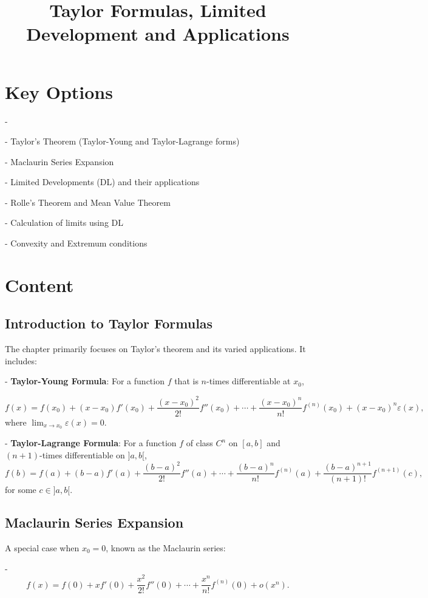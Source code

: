 \documentclass{article}
\title{Taylor Formulas, Limited Development and Applications}
\author{}
\date{}
\begin{document}
\maketitle

\section*{Key Options}

-

- Taylor's Theorem (Taylor-Young and Taylor-Lagrange forms)

- Maclaurin Series Expansion

- Limited Developments (DL) and their applications

- Rolle’s Theorem and Mean Value Theorem

- Calculation of limits using DL

- Convexity and Extremum conditions


\section*{Content}
\subsection*{Introduction to Taylor Formulas}
The chapter primarily focuses on Taylor's theorem and its varied applications. It includes:



- \textbf{Taylor-Young Formula}: For a function $ f $ that is $ n $-times differentiable at $ x_0 $,

\[
	f(x) = f(x_0) + (x - x_0)f'(x_0) + \frac{(x - x_0)^2}{2!}f''(x_0) + \cdots + \frac{(x - x_0)^n}{n!}f^{(n)}(x_0) + (x - x_0)^n \varepsilon(x),
\]
where $ \lim_{x \to x_0} \varepsilon(x) = 0 $.


- \textbf{Taylor-Lagrange Formula}: For a function $ f $ of class $ C^n $ on $ [a, b] $ and $ (n+1) $-times differentiable on $ ]a, b[ $,
\[
	f(b) = f(a) + (b-a)f'(a) + \frac{(b-a)^2}{2!}f''(a) + \cdots + \frac{(b-a)^n}{n!}f^{(n)}(a) + \frac{(b-a)^{n+1}}{(n+1)!}f^{(n+1)}(c),
\]
for some $ c \in ]a, b[ $.


\subsection*{Maclaurin Series Expansion}
A special case when $ x_0 = 0 $, known as the Maclaurin series:


-
\[
	f(x) = f(0) + xf'(0) + \frac{x^2}{2!}f''(0) + \cdots + \frac{x^n}{n!}f^{(n)}(0) + o(x^n).
\]
\end{document}
